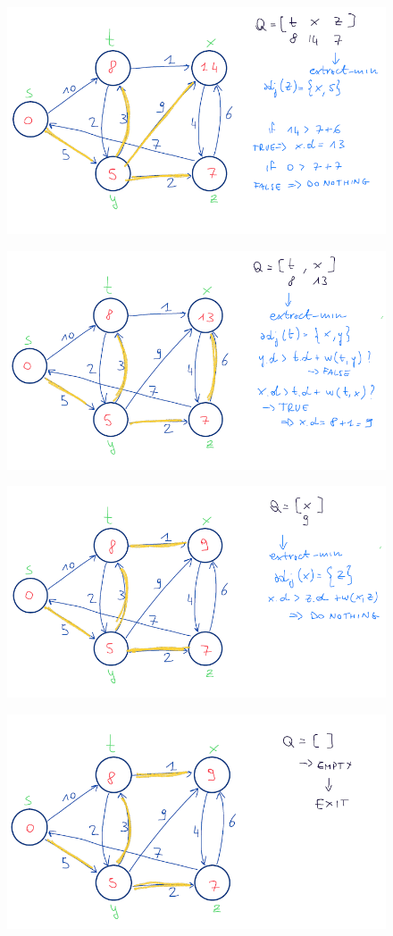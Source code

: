 \begin{figure}[H]
    \centering
    \includegraphics[width=0.75\linewidth]{dij ex 3.png}
    \caption{}
    \label{fig:enter-label}
\end{figure}

\begin{figure}[H]
    \centering
\includegraphics[width=0.75\linewidth]{dij ex 4.png}
    \caption{}
    \label{fig:enter-label}
\end{figure}
\begin{figure}[H]
    \centering
\includegraphics[width=0.75\linewidth]{dij ex 5.png}
    \caption{}
    \label{fig:enter-label}
\end{figure}
\begin{figure}[H]
    \centering
\includegraphics[width=0.75\linewidth]{dij ex 6.png}
    \caption{}
    \label{fig:enter-label}
\end{figure}

